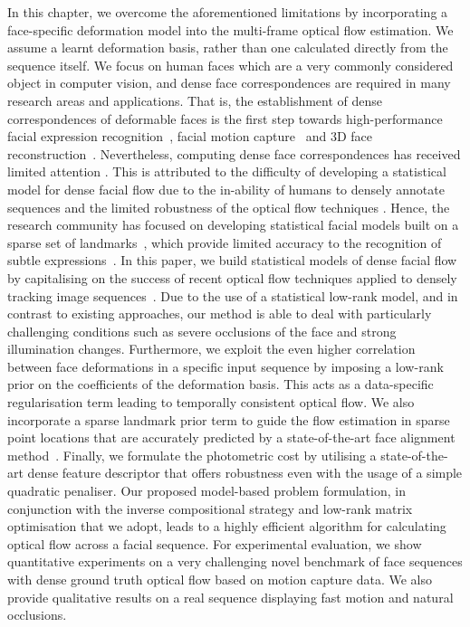 In this chapter, we overcome the aforementioned limitations by incorporating a face-specific 
deformation model into the multi-frame optical flow estimation. We assume a learnt 
deformation basis, rather than one calculated directly from the sequence itself. We 
focus on human faces which are a very commonly considered object in computer vision, 
and dense face correspondences are required in many research areas and applications. 
That is, the establishment of dense correspondences of deformable faces is the first step 
towards high-performance facial expression recognition~\cite{koelstra2010dynamic},
facial motion capture~\cite{Beeler:2011ey} and 3D face reconstruction~\cite{garg2013dense}. 
Nevertheless, computing dense face correspondences has received limited attention 
\cite{decarlo2000optical,yacoob1996recognizing}. This is attributed to the difficulty of 
developing a statistical model for dense facial flow due to the in-ability of humans to 
densely annotate sequences and the limited robustness of the optical flow techniques 
\cite{decarlo2000optical}. Hence, the research community has focused on developing 
statistical facial models built on a sparse set of landmarks~\cite{xiong2013supervised}, 
which provide limited accuracy to the recognition of subtle expressions~\cite{li2013spontaneous}. 
In this paper, we build statistical models of dense facial flow by capitalising
on the success of recent optical flow techniques applied to densely tracking 
image sequences~\cite{garg2013variational}. Due to the use of a statistical 
low-rank model, and in contrast to existing approaches, our method is able to deal with 
particularly challenging conditions such as severe occlusions of the face and strong 
illumination changes. Furthermore, we exploit the even higher correlation 
between face deformations in 
a specific input sequence by imposing a low-rank prior on the coefficients of the 
deformation basis. This acts as a data-specific regularisation term leading to 
temporally consistent optical flow.
We also incorporate a sparse landmark prior term to guide the flow estimation in sparse 
point locations that are accurately predicted by a state-of-the-art face 
alignment method~\cite{kazemi2014one}.
Finally, we formulate the photometric cost by utilising a state-of-the-art dense 
feature descriptor that offers robustness even with the usage of a simple quadratic 
penaliser.
Our proposed model-based problem formulation, in conjunction with the inverse 
compositional strategy and low-rank matrix optimisation that we adopt, leads to a 
highly efficient algorithm for calculating optical flow across a facial sequence.
For experimental evaluation, we show quantitative experiments on a very challenging 
novel benchmark of face sequences with dense ground truth optical flow based on motion 
capture data. We also provide qualitative results on a real sequence displaying
fast motion and natural occlusions.
